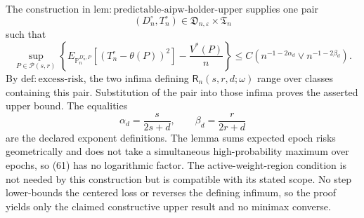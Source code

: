 The construction in \(\mathrm{lem{:}predictable\text{-}aipw\text{-}holder\text{-}upper}\) supplies one pair
\[
(D_n^{\circ},T_n^{\circ})\in
\mathfrak D_{n,\varepsilon}\times\mathfrak T_n
\]
such that
\[
\sup_{P\in\mathcal P(s,r)}
\left\{
E_{\mathbb P_n^{D_n^{\circ},P}}
[(T_n^{\circ}-\theta(P))^2]-\frac{V^*(P)}n
\right\}
\leq C\left(n^{-1-2\alpha_d}\vee n^{-1-2\beta_d}\right).
\tag{61}
\]
By \(\mathrm{def{:}excess\text{-}risk}\), the two infima defining \(\mathsf R_n(s,r,d;\omega)\) range over classes containing this pair. Substitution of the pair into those infima proves the asserted upper bound. The equalities
\[
\alpha_d=\frac{s}{2s+d},\qquad
\beta_d=\frac{r}{2r+d}
\]
are the declared exponent definitions. The lemma sums expected epoch risks geometrically and does not take a simultaneous high-probability maximum over epochs, so (61) has no logarithmic factor. The active-weight-region condition is not needed by this construction but is compatible with its stated scope. No step lower-bounds the centered loss or reverses the defining infimum, so the proof yields only the claimed constructive upper result and no minimax converse.